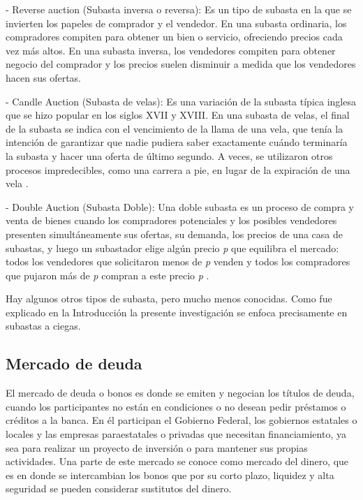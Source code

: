     - Reverse auction (Subasta inversa o reversa):
    Es un tipo de subasta en la que se invierten los papeles de comprador y el vendedor. En una subasta ordinaria, los compradores compiten 
    para obtener un bien o servicio, ofreciendo precios cada vez más altos. En una subasta inversa, los vendedores compiten para obtener 
    negocio del comprador y los precios suelen disminuir a medida que los vendedores hacen sus ofertas.

    - Candle Auction (Subasta de velas):
    Es una variación de la subasta típica inglesa que se hizo popular en los siglos XVII y XVIII. En una subasta de velas, el final 
    de la subasta se indica con el vencimiento de la llama de una vela, que tenía la intención de garantizar que nadie pudiera saber 
    exactamente cuándo terminaría la subasta y hacer una oferta de último segundo. A veces, se utilizaron otros procesos impredecibles, 
    como una carrera a pie, en lugar de la expiración de una vela \parencite{patten1970}.

    - Double Auction (Subasta Doble):
    Una doble subasta es un proceso de compra y venta de bienes cuando los compradores potenciales y los posibles vendedores presenten 
    simultáneamente sus ofertas, su demanda, los precios de una casa de subastas, y luego un subastador elige algún precio \textit{p} que 
    equilibra el mercado: todos los vendedores que solicitaron menos de \textit{p} venden y todos los compradores que pujaron más de 
    \textit{p} compran a este precio \textit{p} \parencite{friedman1992}.
    
    Hay algunos otros tipos de subasta, pero mucho menos conocidas. Como fue explicado en la Introducción la presente investigación se 
    enfoca precisamente en subastas a ciegas.

  \subsection{Mercado de deuda} \hspace*{}

    El mercado de deuda o bonos es donde se emiten y negocian los títulos de deuda, cuando los participantes no están en condiciones o no 
    desean pedir préstamos o créditos a la banca. En él participan el Gobierno Federal, los gobiernos estatales o locales y las empresas 
    paraestatales o privadas que necesitan financiamiento, ya sea para realizar un proyecto de inversión o para mantener sus propias 
    actividades. Una parte de este mercado se conoce como mercado del dinero, que es en donde se intercambian los bonos que por su corto 
    plazo, liquidez y alta seguridad se pueden considerar sustitutos del dinero.

